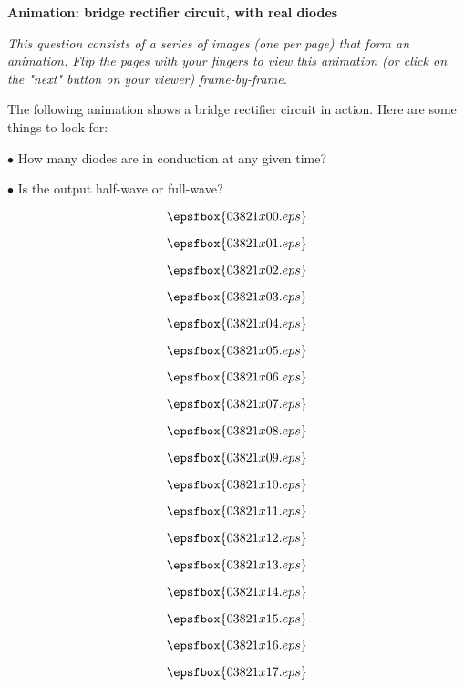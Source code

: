

\centerline{\bf Animation: bridge rectifier circuit, with real diodes}

\vskip 10pt

{\it This question consists of a series of images (one per page) that form an animation.  Flip the pages with your fingers to view this animation (or click on the "next" button on your viewer) frame-by-frame.}

\vskip 10pt

The following animation shows a bridge rectifier circuit in action.  Here are some things to look for:

\medskip
\goodbreak
\item{$\bullet$} How many diodes are in conduction at any given time?
\item{$\bullet$} Is the output half-wave or full-wave?
\medskip

\vfil \eject
$$\epsfbox{03821x00.eps}$$

\vfil \eject
$$\epsfbox{03821x01.eps}$$

\vfil \eject
$$\epsfbox{03821x02.eps}$$

\vfil \eject
$$\epsfbox{03821x03.eps}$$

\vfil \eject
$$\epsfbox{03821x04.eps}$$

\vfil \eject
$$\epsfbox{03821x05.eps}$$

\vfil \eject
$$\epsfbox{03821x06.eps}$$

\vfil \eject
$$\epsfbox{03821x07.eps}$$

\vfil \eject
$$\epsfbox{03821x08.eps}$$

\vfil \eject
$$\epsfbox{03821x09.eps}$$

\vfil \eject
$$\epsfbox{03821x10.eps}$$

\vfil \eject
$$\epsfbox{03821x11.eps}$$

\vfil \eject
$$\epsfbox{03821x12.eps}$$

\vfil \eject
$$\epsfbox{03821x13.eps}$$

\vfil \eject
$$\epsfbox{03821x14.eps}$$

\vfil \eject
$$\epsfbox{03821x15.eps}$$

\vfil \eject
$$\epsfbox{03821x16.eps}$$

\vfil \eject
$$\epsfbox{03821x17.eps}$$

